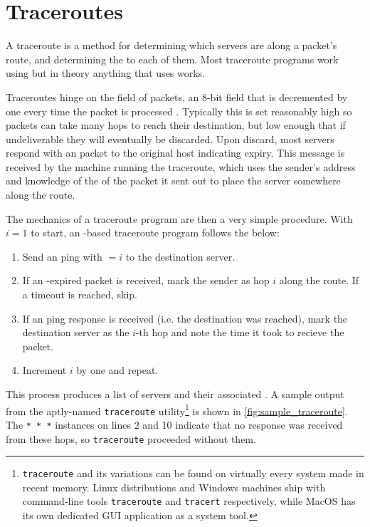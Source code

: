 \section{Traceroutes}\label{sec:background_traceroutes}

A traceroute is a method for determining which servers are along a packet's route, and determining the \rtt to each of them. Most traceroute programs work using \icmp but in theory anything that uses \ip works.

Traceroutes hinge on the \ttl field of \ip packets, an 8-bit field that is decremented by one every time the packet is processed \cite{rfc791}. Typically this is set reasonably high so packets can take many hops to reach their destination, but low enough that if undeliverable they will eventually be discarded. Upon discard, most servers respond with an \icmp packet to the original host indicating \ttl expiry. This message is received by the machine running the traceroute, which uses the sender's \ip address and knowledge of the \ttl of the packet it sent out to place the server somewhere along the route.

The mechanics of a traceroute program are then a very simple procedure. With $i=1$ to start, an \icmp-based traceroute program follows the below:

\begin{enumerate}
    \item Send an \icmp ping with \TTL$=i$ to the destination server.
    \item If an \icmp \ttl-expired packet is received, mark the sender as hop $i$ along the route. If a timeout is reached, skip.
    \item If an \icmp ping response is received (i.e. the destination was reached), mark the destination server as the $i$-th hop and note the time it took to recieve the packet.
    \item Increment $i$ by one and repeat.
\end{enumerate}

This process produces a list of servers and their associated \rtts. A sample output from the aptly-named \texttt{traceroute} utility\footnote{\texttt{traceroute} and its variations can be found on virtually every system made in recent memory. Linux distributions and Windows machines ship with command-line tools \texttt{traceroute} and \texttt{tracert} respectively, while MacOS has its own dedicated GUI application as a system tool.} is shown in \cref{fig:sample_traceroute}. The \texttt{* * *} instances on lines 2 and 10 indicate that no response was received from these hops, so \texttt{traceroute} proceeded without them.


